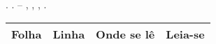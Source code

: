 \begin{resumo}[ERRATA]
    \vspace*{-6mm}
    
    \nomeAutores. \textbf{\tituloDoTrabalho}. \tipoDeTrabalho \space-- \nomeCurso, \nomeInstituicao, \localDefesa, \dataDefesa.

    
    \begin{table}[htbp]
    \centering

    \begin{tabularx}{\textwidth}{C|C|C|C}
        \hline
        
        \textbf{Folha} & \textbf{Linha} & \textbf{Onde se lê} & \textbf{Leia-se} \\ \hline
        
        
    \end{tabularx}
    \end{table}

    
\end{resumo}
